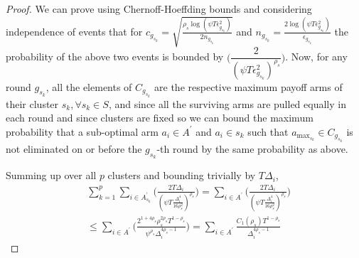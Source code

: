 \begin{proof}
We can prove using Chernoff-Hoeffding bounds and considering independence of events that for $c_{g_{s_{k}}}=\sqrt{\frac{\rho_{s} \log (\psi T\epsilon_{g_{s_{k}}}^{2})}{2 n_{g_{s_{k}}}}}$ and  $n_{g_{s_{k}}}=\frac{2\log{(\psi T\epsilon_{g_{s_{k}}}^{2})}}{\epsilon_{g_{s_{k}}}}$ the probability of the above two events is bounded by $\bigg(\dfrac{2}{(\psi  T\epsilon_{g_{s_{k}}}^{2})^{\rho_{s}}}\bigg)$.
  Now, for any round $g_{s_{k}}$, all the elements of $C_{g_{s_{k}}}$ are the respective maximum payoff arms of their cluster $s_{k}, \forall s_{k}\in S$, and since all the surviving arms are pulled equally in each round and since clusters are fixed so we can bound the maximum probability that a sub-optimal arm $a_{i}\in A^{'}$  and $a_{i}\in s_{k}$ such that $a_{\max_{s_{k}}}\in C_{g_{s_{k}}}$ is not eliminated on or before the $g_{s_{k}}$-th round by the same probability as above. 

 

Summing up over all $p$ clusters and bounding trivially by $T\Delta_{i}$,
 \begin{align*}
 &\sum_{k=1}^{p}\sum_{i\in A_{s_{k}}^{'}}\bigg(\frac{2T\Delta_{i}}{(\psi T\frac{\Delta_{i}^{4}}{16\rho_{s}^{2}})^{\rho_{s}}}\bigg) = \sum_{i\in A^{'}}\bigg(\frac{2T\Delta_{i}}{(\psi  T\frac{\Delta_{i}^{4}}{16\rho_{s}^{2}})^{\rho_{s}}}\bigg) \\
 &\leq \sum_{i\in A^{'}}\bigg(\frac{2^{1+4\rho_{s}}\rho_{s}^{2\rho_{s}}T^{1-\rho_{s}}}{\psi^{\rho_{s}}\Delta_{i}^{4\rho_{s}-1}}\bigg) = \sum_{i\in A^{'}}\frac{C_{1}(\rho_{s})T^{1-\rho_{s}}}{\Delta_{i}^{4\rho_{s}-1}}
 \end{align*}


\end{proof}
